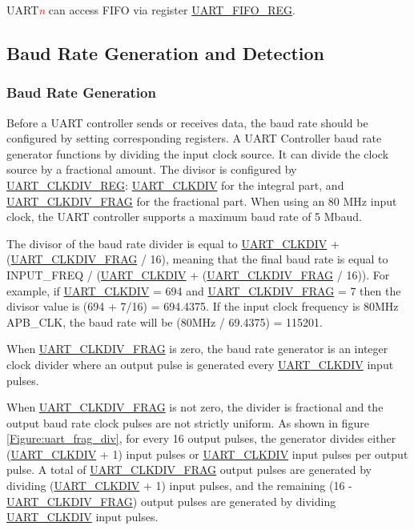 \documentclass[main\_\_EN.tex]{subfiles}
\begin{document}
UART\textcolor{red}{\it{n}} can access FIFO via register \hyperref[regdesc:UARTFIFOREG]{UART\_FIFO\_REG}.

\subsection{Baud Rate Generation and Detection}

\subsubsection{Baud Rate Generation}

Before a UART controller sends or receives data, the baud rate should be configured by setting corresponding registers. A UART Controller baud rate generator functions by dividing the input clock source. It can divide the clock source by a fractional amount. The divisor is configured by \hyperref[regdesc:UARTCLKDIVREG]{UART\_CLKDIV\_REG}: \hyperref[fielddesc:UARTCLKDIV]{UART\_CLKDIV} for the integral part, and \hyperref[fielddesc:UARTCLKDIVFRAG]{UART\_CLKDIV\_FRAG} for the fractional part. When using an 80 MHz input clock, the UART controller supports a maximum baud rate of 5 Mbaud.

The divisor of the baud rate divider is equal to \hyperref[fielddesc:UARTCLKDIV]{UART\_CLKDIV} + (\hyperref[fielddesc:UARTCLKDIVFRAG]{UART\_CLKDIV\_FRAG} / 16), meaning that the final baud rate is equal to
INPUT\_FREQ / (\hyperref[fielddesc:UARTCLKDIV]{UART\_CLKDIV} + (\hyperref[fielddesc:UARTCLKDIVFRAG]{UART\_CLKDIV\_FRAG} / 16)). For example, if \hyperref[fielddesc:UARTCLKDIV]{UART\_CLKDIV} = 694 and \hyperref[fielddesc:UARTCLKDIVFRAG]{UART\_CLKDIV\_FRAG} = 7
then the divisor value is (694 + 7/16) = 694.4375. If the input clock frequency is 80MHz APB\_CLK, the baud rate will be
(80MHz / 69.4375) = 115201.

When \hyperref[fielddesc:UARTCLKDIVFRAG]{UART\_CLKDIV\_FRAG} is zero, the baud rate generator is an integer clock divider where an output pulse is generated every
\hyperref[fielddesc:UARTCLKDIV]{UART\_CLKDIV} input pulses.

When \hyperref[fielddesc:UARTCLKDIVFRAG]{UART\_CLKDIV\_FRAG} is not zero, the divider is fractional and the output baud rate clock pulses are not strictly uniform.
As shown in figure \ref{Figure:uart_frag_div}, for every 16 output pulses, the generator divides either (\hyperref[fielddesc:UARTCLKDIV]{UART\_CLKDIV} + 1) input pulses or \hyperref[fielddesc:UARTCLKDIV]{UART\_CLKDIV} input pulses per
output pulse. A total of \hyperref[fielddesc:UARTCLKDIVFRAG]{UART\_CLKDIV\_FRAG} output pulses are generated by dividing (\hyperref[fielddesc:UARTCLKDIV]{UART\_CLKDIV} + 1) input pulses, and the remaining
(16 - \hyperref[fielddesc:UARTCLKDIVFRAG]{UART\_CLKDIV\_FRAG}) output pulses are generated by dividing \hyperref[fielddesc:UARTCLKDIV]{UART\_CLKDIV} input pulses.
\end{document}

